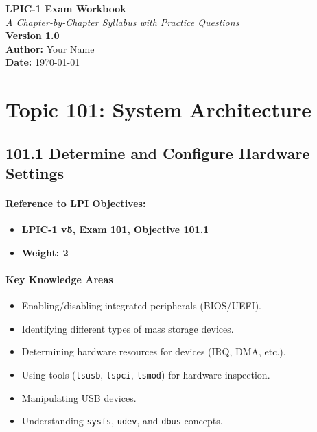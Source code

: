 \documentclass[12pt,a4paper]{report}
\begin{document}
\begin{titlepage}
    \centering
    \vspace*{3cm}
    {\Huge \textbf{LPIC-1 Exam Workbook}}\\
    \vspace{1cm}
    {\large \textit{A Chapter-by-Chapter Syllabus with Practice Questions}}\\
    \vfill
    {\large \textbf{Version 1.0}}\\
    \vspace{2cm}
    \vfill
    \textbf{Author:} Your Name \\
    \textbf{Date:} \today
    \vspace{2cm}
\end{titlepage}

\tableofcontents
\newpage

\chapter{Topic 101: System Architecture}

\section{101.1 Determine and Configure Hardware Settings}

\subsubsection*{Reference to LPI Objectives:}
\begin{itemize}
    \item \textbf{LPIC-1 v5, Exam 101, Objective 101.1}
    \item \textbf{Weight: 2}
\end{itemize}

\subsubsection*{Key Knowledge Areas}
\begin{itemize}
    \item Enabling/disabling integrated peripherals (BIOS/UEFI).
    \item Identifying different types of mass storage devices.
    \item Determining hardware resources for devices (IRQ, DMA, etc.).
    \item Using tools (\texttt{lsusb}, \texttt{lspci}, \texttt{lsmod}) for hardware inspection.
    \item Manipulating USB devices.
    \item Understanding \texttt{sysfs}, \texttt{udev}, and \texttt{dbus} concepts.
\end{itemize}
\end{document}
